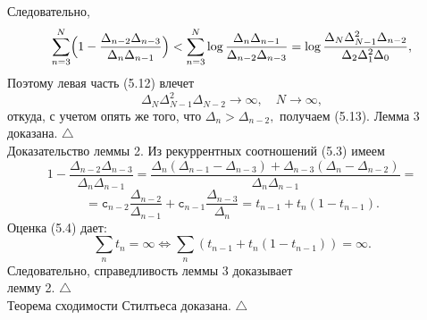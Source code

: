 \documentclass[12 pt, a4 paper]{article}
\theoremstyle{plain}   \newtheorem{Pro}{Задача}
\begin{document}
Следовательно,
$$
  \sum _{n=3}^N \Bigl (
    1-\frac{\Delta _{n-2}\Delta _{n-3}}
	  {\Delta _n \Delta _{n-1}} \Bigr ) <
	    \sum _{n=3}^N \log
		  \frac{\Delta _n \Delta _{n-1}}
		    {\Delta _{n-2}\Delta _{n-3}}=
			  \log
			    \frac{\Delta _N \Delta _{N-1}^2 \Delta _{n-2}}
				  {\Delta _2 \Delta _1 ^2 \Delta _0} ,
$$
Поэтому левая часть (5.12) влечет
$$
  \Delta _N \Delta _{N-1}^2 \Delta _{N-2} \longrightarrow \infty ,
    \quad N \rightarrow \infty ,
$$
откуда, с учетом опять же того, что
$ \Delta _n > \Delta _{n-2} , $
получаем (5.13).
Лемма 3 доказана. $ \triangle $ \\
{\Large Доказательство леммы 2.}
Из рекуррентных соотношений (5.3) имеем
$$
  1-\frac{\Delta _{n-2}\Delta _{n-3}}
    {\Delta _n \Delta _{n-1}}=
	  \frac{\Delta _n (\Delta _{n-1}-\Delta _{n-3})+
	    \Delta _{n-3}(\Delta _n -\Delta _{n-2})}
		  {\Delta _n \Delta _{n-1}}=
$$
$$
  = \mathtt{c}_{n-2}\frac{\Delta _{n-2}}{\Delta _{n-1}}+
    \mathtt{c}_{n-1}\frac{\Delta _{n-3}}{\Delta _n} =
	  t_{n-1}+t_n (1-t_{n-1}).
$$
Оценка (5.4) дает:
$$
  \sum _n t_n =\infty \Longleftrightarrow
    \sum _n (t_{n-1}+t_n (1-t_{n-1}))=\infty .
$$
Следовательно, справедливость леммы 3 доказывает \\
лемму 2.
$ \triangle $ \\
Теорема сходимости Стилтьеса доказана. $ \triangle $
\newpage
\end{document}
